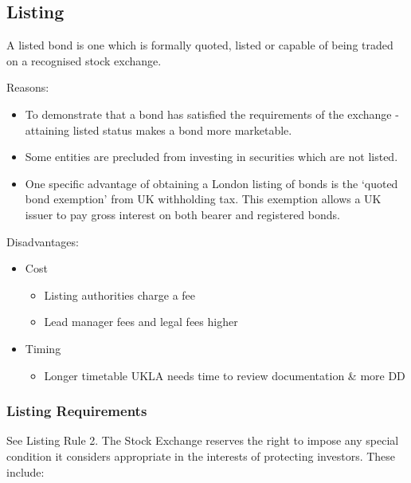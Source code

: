 \documentclass[
]{article}
\providecommand{\tightlist}{%
  \setlength{\itemsep}{0pt}\setlength{\parskip}{0pt}}
\begin{document}
\hypertarget{listing}{%
\subsection{Listing}\label{listing}}

A listed bond is one which is formally quoted, listed or capable of
being traded on a recognised stock exchange.

Reasons:

\begin{itemize}
\tightlist
\item
  To demonstrate that a bond has satisfied the requirements of the
  exchange - attaining listed status makes a bond more marketable.
\item
  Some entities are precluded from investing in securities which are not
  listed.
\item
  One specific advantage of obtaining a London listing of bonds is the
  `quoted bond exemption' from UK withholding tax. This exemption allows
  a UK issuer to pay gross interest on both bearer and registered bonds.
\end{itemize}

Disadvantages:

\begin{itemize}
\tightlist
\item
  Cost

  \begin{itemize}
  \tightlist
  \item
    Listing authorities charge a fee
  \item
    Lead manager fees and legal fees higher
  \end{itemize}
\item
  Timing

  \begin{itemize}
  \tightlist
  \item
    Longer timetable UKLA needs time to review documentation \& more DD
  \end{itemize}
\end{itemize}

\hypertarget{listing-requirements}{%
\subsubsection{Listing Requirements}\label{listing-requirements}}

See Listing Rule 2. The Stock Exchange reserves the right to impose any
special condition it considers appropriate in the interests of
protecting investors. These include:
\end{document}

